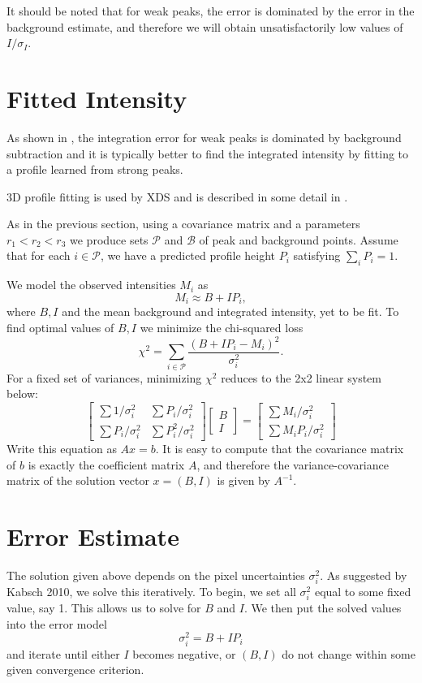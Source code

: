 \documentclass{report}
\newcommand{\calP}{\mathcal{P}}
\newcommand{\calB}{\mathcal{B}}
\begin{document}
It should be noted that for weak peaks, the error is dominated by the error in the background estimate, and therefore we will obtain unsatisfactorily low values of $I/\sigma_I$.

\section{Fitted Intensity}
As shown in \cite{diamond-1969}, the integration error for weak peaks is dominated by background subtraction
and it is typically better to find the integrated intensity by fitting to a profile learned from strong peaks.

3D profile fitting is used by XDS \cite{xds-2010} and is described in some detail in \cite{kabsch-1988, kabsch-2010}.

As in the previous section, using a covariance matrix and a parameters $r_1 < r_2 < r_3$ we produce sets $\calP$ and $\calB$ of peak and background points. Assume that for each $i \in \calP$, we have a predicted profile height $P_i$ satisfying $\sum_i P_i = 1$.

We model the observed intensities $M_i$ as
\[ M_i \approx B + I P_i, \]
where $B, I$ and the mean background and integrated intensity, yet to be fit. To find optimal values of $B,I$ we minimize the chi-squared loss
\[ \chi^2 = \sum_{i \in \calP} \frac{(B+IP_i - M_i)^2}{\sigma^2_i}. \]
For a fixed set of variances, minimizing $\chi^2$ reduces to the 2x2 linear system below:
\[ \begin{bmatrix}
  \sum 1/\sigma^2_i & \sum P_i / \sigma^2_i \\
  \sum P_i/\sigma_i^2 & \sum P_i^2 / \sigma^2_i
\end{bmatrix}
\begin{bmatrix} B \\ I \end{bmatrix}
 = \begin{bmatrix} \sum M_i/\sigma^2_i \\ \sum M_i P_i / \sigma^2_i \end{bmatrix} \]
 Write this equation as $Ax = b$. It is easy to compute that the covariance matrix of $b$ is exactly the coefficient matrix
 $A$, and therefore the variance-covariance matrix of the solution vector $x = (B, I)$ is given by $A^{-1}$.

 \section{Error Estimate} The solution given above depends on the pixel uncertainties $\sigma_i^2$. As suggested by Kabsch 2010, we solve this iteratively. To begin, we set all $\sigma^2_i$ equal to some fixed value, say 1. This allows us to solve for $B$ and $I$. We then put the solved values into the error model
\[ \sigma_i^2 = B + I P_i \]
and iterate until either $I$ becomes negative, or $(B, I)$ do not change within some given convergence criterion.
\end{document}
